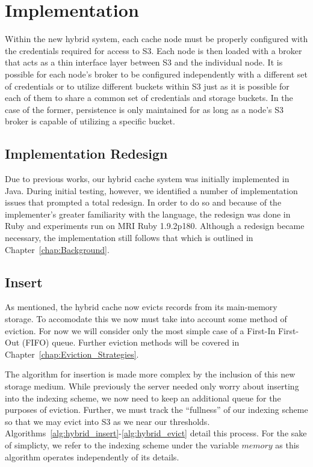 
\section{Implementation} %
\label{sec:Implementation}
Within the new hybrid system, each cache node must be properly configured with
the credentials required for access to S3. Each node is then loaded with a
broker that acts as a thin interface layer between S3 and the individual node.
It is possible for each node's broker to be configured independently with a
different set of credentials or to utilize different buckets within S3 just as
it is possible for each of them to share a common set of credentials and
storage buckets. In the case of the former, persistence is only maintained for
as long as a node's S3 broker is capable of utilizing a specific bucket.

\subsection{Implementation Redesign} %
\label{sec:hybrid_redesign}
Due to previous works\cite{chiu_ccgrid11,chiu_ijngc11}, our hybrid cache system
was initially implemented in Java. During initial testing, however, we
identified a number of implementation issues that prompted a total redesign. In
order to do so and because of the implementer's greater familiarity with the
language, the redesign was done in Ruby and experiments run on MRI Ruby
1.9.2p180. Although a redesign became necessary, the implementation still
follows that which is outlined in Chapter~\ref{chap:Background}.


\subsection{Insert} %
\label{sub:hybrid_insert}
As mentioned, the hybrid cache now evicts records from its main-memory storage.
To accomodate this we now must take into account some method of eviction. For
now we will consider only the most simple case of a First-In First-Out (FIFO)
queue. Further eviction methods will be covered in
Chapter~\ref{chap:Eviction_Strategies}.

The algorithm for insertion is made more complex by the inclusion of this new
storage medium. While previously the server needed only worry about inserting
into the indexing scheme, we now need to keep an additional queue for the
purposes of eviction. Further, we must track the ``fullness'' of our indexing
scheme so that we may evict into S3 as we near our thresholds.
Algorithms~\ref{alg:hybrid_insert}-\ref{alg:hybrid_evict} detail this process.
For the sake of simplicty, we refer to the indexing scheme under the variable
$memory$ as this algorithm operates independently of its details.

